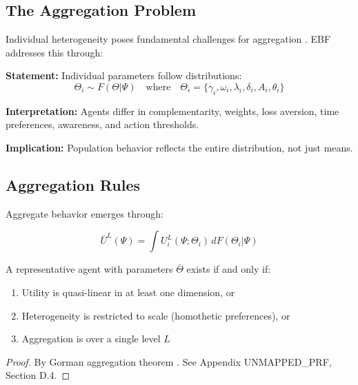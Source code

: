 \subsection{The Aggregation Problem}

Individual heterogeneity poses fundamental challenges for aggregation
\citep{kirman1992whom}. EBF addresses this through:

\begin{tcolorbox}[colback=gray!5!white, colframe=gray!75!black,
    title=Axiom AZ-H1: Distributional Heterogeneity]
\textbf{Statement:} Individual parameters follow distributions:
\begin{equation}
\Theta_i \sim F(\Theta | \Psi) \quad \text{where} \quad \Theta_i = \{\gamma_i, \omega_i, \lambda_i, \delta_i, A_i, \theta_i\}
\end{equation}

\textbf{Interpretation:} Agents differ in complementarity, weights, loss aversion,
time preferences, awareness, and action thresholds.

\textbf{Implication:} Population behavior reflects the entire distribution, not just means.
\end{tcolorbox}

\subsection{Aggregation Rules}

Aggregate behavior emerges through:

\begin{equation}
\bar{U}^L(\Psi) = \int U^L_i(\Psi; \Theta_i) \, dF(\Theta_i | \Psi)
\end{equation}

\begin{proposition}
A representative agent with parameters $\bar{\Theta}$ exists if and only if:
\begin{enumerate}
\item Utility is quasi-linear in at least one dimension, or
\item Heterogeneity is restricted to scale (homothetic preferences), or
\item Aggregation is over a single level $L$
\end{enumerate}
\end{proposition}

\begin{proof}
By Gorman aggregation theorem \citep{gorman1953community}.
See Appendix UNMAPPED_PRF, Section D.4.
\end{proof}

